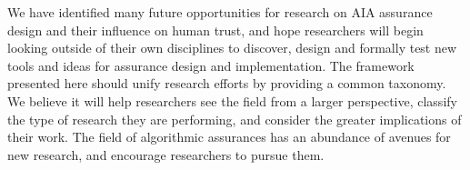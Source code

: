 We have identified many future opportunities for research on AIA assurance design and their influence on human trust, and hope researchers will begin looking outside of their own disciplines to discover, design and formally test new tools and ideas for assurance design and implementation. The framework presented here should unify research efforts by providing a common taxonomy. We believe it will help researchers see the field from a larger perspective, classify the type of research they are performing, and consider the greater implications of their work. The field of algorithmic assurances has an abundance of avenues for new research, and encourage researchers to pursue them.
